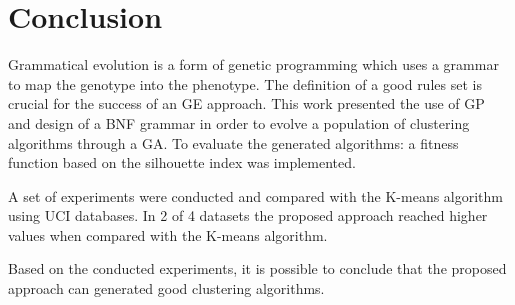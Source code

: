 \documentclass[journal]{IEEEtran}
\begin{document}
		
	\section{Conclusion} \label{sec:conclusion}
	
	Grammatical evolution is a form of genetic programming which uses a grammar to map the genotype into the phenotype. The definition of a good rules set is crucial for the success of an GE approach. This work presented the use of GP and design of a BNF grammar in order to evolve a population of clustering algorithms through a GA. To evaluate the generated algorithms: a fitness function based on the silhouette index was implemented.
	
	A set of experiments were conducted and compared with the K-means algorithm using UCI databases. In 2 of 4 datasets the proposed approach reached higher values when compared with the K-means algorithm.
	
	Based on the conducted experiments, it is possible to conclude that the proposed approach can generated good clustering algorithms.
	
	
	
	
\end{document}
